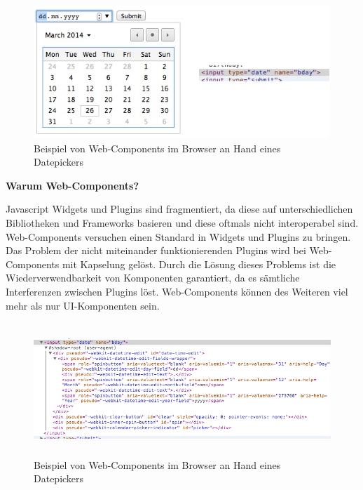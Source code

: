 \begin{figure}[H]
\centering
\includegraphics[height=5.0cm]{images/datepicker.jpg}
\caption[
Beispiel von Web-Components im Browser an Hand eines Datepickers, Urldate: 04.2014
\newline
\small\texttt{\url{https://s3.amazonaws.com/infinum.web.production/repository\_items/files/000/000/238/original/datepicker.jpg}}
]{Beispiel von Web-Components im Browser an Hand eines Datepickers}
\label{fig:3_Datepicker_Visuals}
\end{figure}

\textbf{Warum Web-Components?}

Javascript Widgets und Plugins sind fragmentiert, da diese auf unterschiedlichen Bibliotheken und Frameworks basieren und diese oftmals nicht interoperabel sind. Web-Components versuchen einen Standard in Widgets und Plugins zu bringen. Das Problem der nicht miteinander funktionierenden Plugins wird bei Web-Components mit Kapselung gelöst. Durch die Lösung dieses Problems ist die Wiederverwendbarkeit von Komponenten garantiert, da es sämtliche Interferenzen zwischen Plugins löst. Web-Components können des Weiteren viel mehr als nur UI-Komponenten sein.

\begin{figure}[H]
\centering
\includegraphics[height=5.0cm]{images/datepicker_shadow_dom.jpg}
\caption[
Beispiel von Web-Components im Browser an Hand eines Datepickers, Urldate: 04.2014
\newline
\small\texttt{\url{https://s3.amazonaws.com/infinum.web.production/repository\_items/files/000/000/236/original/datepicker\_shadow\_dom.jpg}}
]{Beispiel von Web-Components im Browser an Hand eines Datepickers}
\label{fig:3_Datepicker_Source}
\end{figure}

